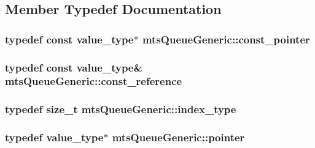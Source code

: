 \subsection{Member Typedef Documentation}
\hypertarget{classmts_queue_generic_a9b295370295fe53fee2f04a2ebd929b8}{
\subsubsection[{const\-\_\-pointer}]{\setlength{\rightskip}{0pt plus 5cm}typedef const {\bf value\-\_\-type}$\ast$ {\bf mts\-Queue\-Generic\-::const\-\_\-pointer}}}\label{classmts_queue_generic_a9b295370295fe53fee2f04a2ebd929b8}
\hypertarget{classmts_queue_generic_ad133c14265ada42f3347b90ccdd28cd3}{
\subsubsection[{const\-\_\-reference}]{\setlength{\rightskip}{0pt plus 5cm}typedef const {\bf value\-\_\-type}\& {\bf mts\-Queue\-Generic\-::const\-\_\-reference}}}\label{classmts_queue_generic_ad133c14265ada42f3347b90ccdd28cd3}
\hypertarget{classmts_queue_generic_a7ff0edcb4cb9771a7085933f2bf022ed}{
\subsubsection[{index\-\_\-type}]{\setlength{\rightskip}{0pt plus 5cm}typedef size\-\_\-t {\bf mts\-Queue\-Generic\-::index\-\_\-type}}}\label{classmts_queue_generic_a7ff0edcb4cb9771a7085933f2bf022ed}
\hypertarget{classmts_queue_generic_aa3ad46661cfdf9f182fd9c32315930a5}{
\subsubsection[{pointer}]{\setlength{\rightskip}{0pt plus 5cm}typedef {\bf value\-\_\-type}$\ast$ {\bf mts\-Queue\-Generic\-::pointer}}}\label{classmts_queue_generic_aa3ad46661cfdf9f182fd9c32315930a5}
